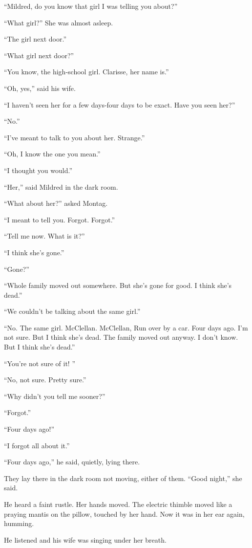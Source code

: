 \documentclass[11pt,openany]{book}
\begin{document}
``Mildred, do you know that girl I was telling you about?''

``What girl?'' She was almost asleep.

``The girl next door.''

``What girl next door?''

``You know, the high-school girl. Clarisse, her name is.''

``Oh, yes,'' said his wife.

``I haven't seen her for a few days-four days to be exact. Have you seen her?''

``No.''

``I've meant to talk to you about her. Strange.''

``Oh, I know the one you mean.''

``I thought you would.''

``Her,'' said Mildred in the dark room.

``What about her?'' asked Montag.

``I meant to tell you. Forgot. Forgot.''

``Tell me now. What is it?''

``I think she's gone.''

``Gone?''

``Whole family moved out somewhere. But she's gone for good. I think she's dead.''

``We couldn't be talking about the same girl.''

``No. The same girl. McClellan. McClellan, Run over by a car. Four days ago. I'm not sure. But I think she's dead. The family moved out anyway. I don't know. But I think she's dead.''

``You're not sure of it! ''

``No, not sure. Pretty sure.''

``Why didn't you tell me sooner?''

``Forgot.''

``Four days ago!''

``I forgot all about it.''

``Four days ago,'' he said, quietly, lying there.

They lay there in the dark room not moving, either of them. ``Good night,'' she said.

He heard a faint rustle. Her hands moved. The electric thimble moved like a praying mantis on the pillow, touched by her hand. Now it was in her ear again, humming.

He listened and his wife was singing under her breath.
\end{document}
